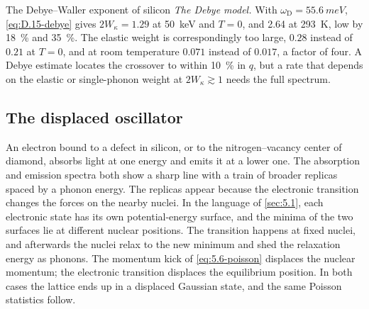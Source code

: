 \begin{workedexample}{The Debye--Waller exponent of silicon}
\emph{The Debye model.} With $\omega_{\mathrm{D}} = \SI{55.6}{meV}$, \cref{eq:D.15-debye} gives $2W_\kappa = 1.29$ at \SI{50}{keV} and $T = 0$, and \num{2.64} at \SI{293}{K}, low by \SI{18}{\percent} and \SI{35}{\percent}. The elastic weight is correspondingly too large, $0.28$ instead of $0.21$ at $T = 0$, and at room temperature $0.071$ instead of $0.017$, a factor of four. A Debye estimate locates the crossover to within \SI{10}{\percent} in $q$, but a rate that depends on the elastic or single-phonon weight at $2W_\kappa \gtrsim 1$ needs the full spectrum.
\end{workedexample}

\subsection{The displaced oscillator}

An electron bound to a defect in silicon, or to the nitrogen--vacancy center of diamond, absorbs light at one energy and emits it at a lower one. The absorption and emission spectra both show a sharp line with a train of broader replicas spaced by a phonon energy. The replicas appear because the electronic transition changes the forces on the nearby nuclei. In the language of \cref{sec:5.1}, each electronic state has its own potential-energy surface, and the minima of the two surfaces lie at different nuclear positions. The transition happens at fixed nuclei, and afterwards the nuclei relax to the new minimum and shed the relaxation energy as phonons. The momentum kick of \cref{eq:5.6-poisson} displaces the nuclear momentum; the electronic transition displaces the equilibrium position. In both cases the lattice ends up in a displaced Gaussian state, and the same Poisson statistics follow.

